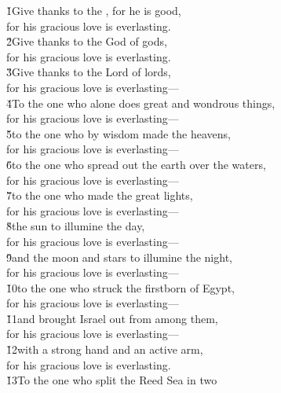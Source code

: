 
\begin{poetry}
\poeml \v{1}Give thanks to the , for he is good, \\
\poemll    for his gracious love is everlasting. \\
\poeml \v{2}Give thanks to the God of gods, \\
\poemll    for his gracious love is everlasting. \\
\poeml \v{3}Give thanks to the Lord of lords, \\
\poemll    for his gracious love is everlasting--- \\
\poeml \v{4}To the one who alone does great and wondrous things, \\
\poemll    for his gracious love is everlasting--- \\
\poeml \v{5}to the one who by wisdom made the heavens, \\
\poemll    for his gracious love is everlasting--- \\
\poeml \v{6}to the one who spread out the earth over the waters, \\
\poemll    for his gracious love is everlasting--- \\
\poeml \v{7}to the one who made the great lights, \\
\poemll    for his gracious love is everlasting--- \\
\poeml \v{8}the sun to illumine the day, \\
\poemll    for his gracious love is everlasting--- \\
\poeml \v{9}and the moon and stars to illumine the night, \\
\poemll    for his gracious love is everlasting--- \\
\poeml \v{10}to the one who struck the firstborn of Egypt, \\
\poemll    for his gracious love is everlasting--- \\
\poeml \v{11}and brought Israel out from among them, \\
\poemll    for his gracious love is everlasting--- \\
\poeml \v{12}with a strong hand and an active arm, \\
\poemll    for his gracious love is everlasting. \\
\poeml \v{13}To the one who split the Reed Sea in two \\

\end{poetry}
